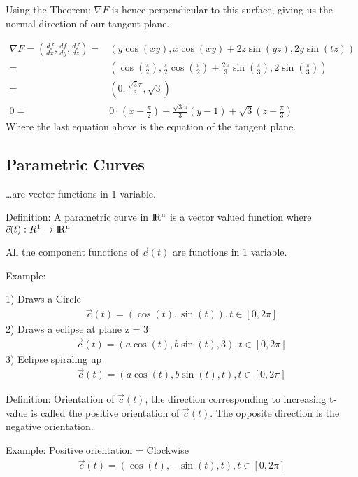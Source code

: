 \documentclass{article}
\newcommand{\R}{\rm I\!R}
\begin{document}
        Using the Theorem: $\nabla F$ is hence perpendicular to this surface, giving us the normal direction of our tangent plane.
        
        \begin{align}
            \nabla F = (\frac{df}{dx},\frac{df}{dy},\frac{df}{dz})
            =& (y\cos(xy),x\cos(xy)+2z\sin(yz),2y\sin(tz))\\
            =& (\cos(\frac{\pi}{2}),\frac{\pi}{2}\cos(\frac{\pi}{2})+\frac{2\pi}{3}\sin(\frac{\pi}{3}),2\sin(\frac{\pi}{3}))\\
            =& (0,\frac{\sqrt{3}\pi}{3},\sqrt{3})\\
            0=&0\cdot(x-\frac{\pi}{2}) + \frac{\sqrt{3}\pi}{3}(y-1)+\sqrt{3}(z-\frac{\pi}{3})
        \end{align}
        Where the last equation above is the equation of the tangent plane.
        
    \subsection{Parametric Curves}
        \dots are vector functions in 1 variable.
        
        Definition: A parametric curve in $\R^n$ is a vector valued function where $\vec{c}(t):R^1\rightarrow\R^n$
        
        All the component functions of $\vec{c}(t)$ are functions in 1 variable.
        
        Example:
        
        1) Draws a Circle
        \begin{align}
            \vec{c}(t) = (\cos(t),\sin(t)),t\in[0,2\pi]
        \end{align}
        2) Draws a eclipse at plane z = 3
        \begin{align}
            \vec{c}(t) = (a\cos(t),b\sin(t),3),t\in[0,2\pi]
        \end{align}
        3) Eclipse spiraling up
        \begin{align}
            \vec{c}(t) = (a\cos(t),b\sin(t),t),t\in[0,2\pi]
        \end{align}
        
        Definition: Orientation of $\vec{c}(t)$, the direction corresponding to increasing t-value is called the positive orientation of $\vec{c}(t)$. The opposite direction is the negative orientation.
        
        Example: Positive orientation = Clockwise
        \begin{align}
            \vec{c}(t) = (\cos(t),-\sin(t),t),t\in[0,2\pi]
        \end{align}
        
\end{document}
